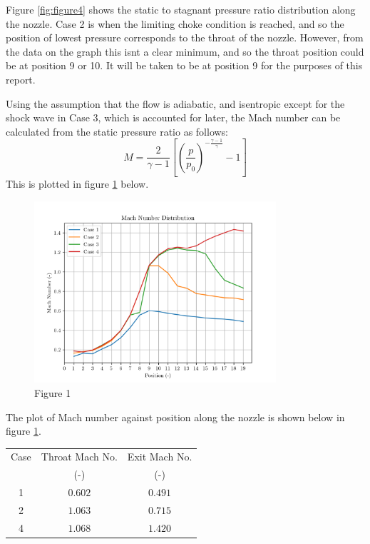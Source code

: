 \documentclass[8pt]{article}
\begin{document}
Figure \ref{fig:figure4} shows the static to stagnant pressure ratio distribution along the nozzle.
Case 2 is when the limiting choke condition is reached, and so the position of lowest pressure corresponds to the throat of the nozzle.
However, from the data on the graph this isnt a clear minimum, and so the throat position could be at position 9 or 10.
It will be taken to be at position 9 for the purposes of this report.

Using the assumption that the flow is adiabatic, and isentropic except for the shock wave in Case 3, which is accounted for later, the Mach number can be calculated from the static pressure ratio as follows:
\begin{equation}
    M = \frac{2}{\gamma - 1} \left[ \left( \frac{p}{p_0} \right) ^ {-\frac{\gamma - 1}{\gamma}} - 1 \right]
\end{equation}
This is plotted in figure \ref{fig:figure5} below.

\begin{figure}[H]
    \centering
    \includegraphics[width=0.8\textwidth]{mach_number_distribution_corrected.png}
    \caption{Figure 1}
    \label{fig:figure5}
\end{figure}
The plot of Mach number against position along the nozzle is shown below in figure \ref{fig:figure5}.

\begin{center}
    \begin{tabular}{|c|c|c|}
    \hline 
    Case & Throat Mach No.  & Exit Mach No.\\
     & (-) & (-) \\
    \hline 
    1 & $0.602$ & $0.491$ \\
    2 & $1.063$ & $0.715$ \\
    4 & $1.068$ & $1.420$ \\
    \hline
    \end{tabular}
    \label{tab:1}
\end{center}
\end{document}

